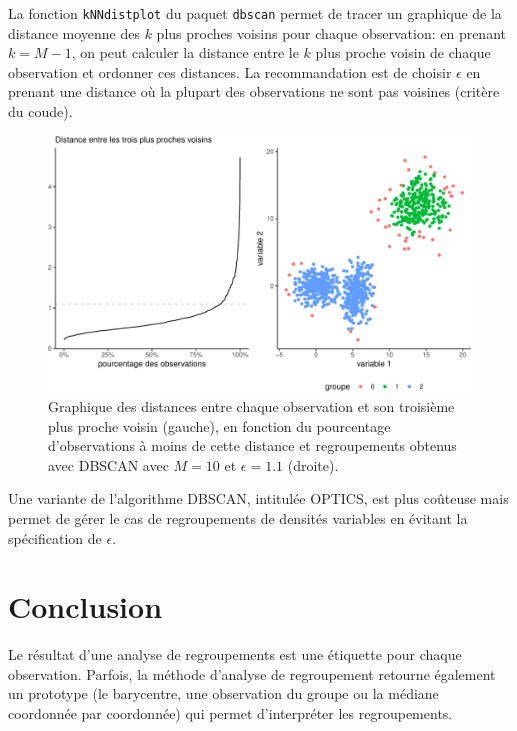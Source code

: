 \documentclass[
  11pt,
  letterpaper,
]{book}
\theoremstyle{definition}
\theoremstyle{remark}
\begin{document}
La fonction \texttt{kNNdistplot} du paquet \texttt{dbscan} permet de
tracer un graphique de la distance moyenne des \(k\) plus proches
voisins pour chaque observation: en prenant \(k=M-1\), on peut calculer
la distance entre le \(k\) plus proche voisin de chaque observation et
ordonner ces distances. La recommandation est de choisir \(\epsilon\) en
prenant une distance où la plupart des observations ne sont pas voisines
(critère du coude).

\begin{figure}[ht!]

{\centering \includegraphics[width=1\textwidth,height=\textheight]{./03-regroupements_files/figure-pdf/fig-dbscan2-1.pdf}

}

\caption{\label{fig-dbscan2}Graphique des distances entre chaque
observation et son troisième plus proche voisin (gauche), en fonction du
pourcentage d'observations à moins de cette distance et regroupements
obtenus avec DBSCAN avec \(M=10\) et \(\epsilon=1.1\) (droite).}

\end{figure}

Une variante de l'algorithme DBSCAN, intitulée OPTICS, est plus coûteuse
mais permet de gérer le cas de regroupements de densités variables en
évitant la spécification de \(\epsilon\).

\hypertarget{conclusion}{%
\section{Conclusion}\label{conclusion}}

Le résultat d'une analyse de regroupements est une étiquette pour chaque
observation. Parfois, la méthode d'analyse de regroupement retourne
également un prototype (le barycentre, une observation du groupe ou la
médiane coordonnée par coordonnée) qui permet d'interpréter les
regroupements.
\end{document}
